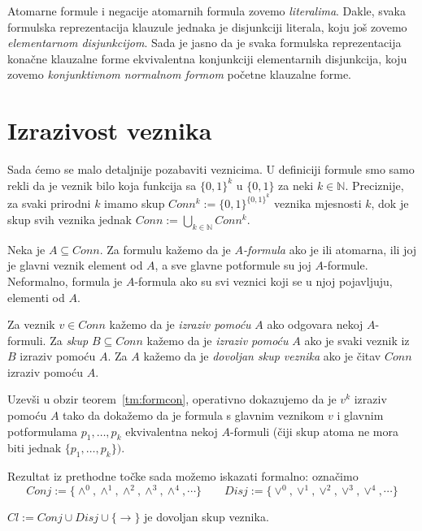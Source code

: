 \begin{definicija}
	Atomarne formule i negacije atomarnih formula zovemo \emph{literalima}.
	Dakle, svaka formulska reprezentacija klauzule jednaka je disjunkciji literala, koju još zovemo \emph{elementarnom disjunkcijom}. Sada je jasno da je svaka formulska reprezentacija konačne klauzalne forme ekvivalentna konjunkciji elementarnih disjunkcija, koju zovemo \emph{konjunktivnom normalnom formom} početne klauzalne forme.
\end{definicija}

\section{Izrazivost veznika}
Sada ćemo se malo detaljnije pozabaviti veznicima. U definiciji formule smo samo rekli da je veznik bilo koja funkcija sa $\{0,1\}^k$ u $\{0,1\}$ za neki $k\in\mathbb N$. Preciznije, za svaki prirodni $k$ imamo skup $Conn^k:=\{0,1\}^{\{0,1\}^k}$ veznika mjesnosti $k$, dok je skup svih veznika jednak $Conn:=\bigcup_{k\in\mathbb N}Conn^k$.

\begin{definicija}
Neka je $A\subseteq Conn$. Za formulu kažemo da je $A$\emph{-formula} ako je ili atomarna, ili joj je glavni veznik element od $A$, a sve glavne potformule su joj $A$-formule. Neformalno, formula je $A$-formula ako su svi veznici koji se u njoj pojavljuju, elementi od $A$.
	
Za veznik $v\in Conn$ kažemo da je \emph{izraziv pomoću} $A$ ako odgovara nekoj $A$-formuli. Za \emph{skup} $B\subseteq Conn$ kažemo da je \emph{izraziv pomoću} $A$ ako je svaki veznik iz $B$ izraziv pomoću $A$. Za $A$ kažemo da je \emph{dovoljan skup veznika} ako je čitav $Conn$ izraziv pomoću $A$.
\end{definicija}

Uzevši u obzir teorem~\ref{tm:formcon}, operativno dokazujemo da je $v^k$ izraziv pomoću $A$ tako da dokažemo da je formula s glavnim veznikom $v$ i glavnim potformulama $p_1, \ldots, p_k$ ekvivalentna nekoj $A$-formuli (čiji skup atoma ne mora biti jednak $\{p_1,\ldots,p_k\})$.

Rezultat iz prethodne točke sada možemo iskazati formalno: označimo
$$Conj:=\{\wedge^0, \wedge^1, \wedge^2, \wedge^3,\wedge^4,\cdots\}\qquad Disj:=\{\vee^0, \vee^1, \vee^2,\vee^3,\vee^4,\cdots\}$$

\begin{teorem}
$Cl:=Conj\cup Disj\cup\{\to\}$ je
dovoljan skup veznika.
\end{teorem}

